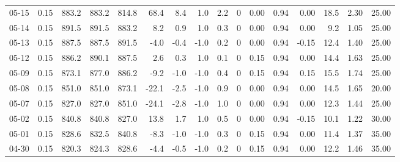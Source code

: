 \begin{threeparttable}
{\begin{tabular}{lrrrrrrrrrrrrrrr}
  05-15 &     0.15 & 883.2 & 883.2 & 814.8 &       68.4 &            8.4 &                      1.0 &                 2.2 &              0 &       0.00 &      0.94 &           0.00 &             18.5 &            2.30 &                  25.00 \\
  05-14 &     0.15 & 891.5 & 891.5 & 883.2 &        8.2 &            0.9 &                      1.0 &                 0.3 &              0 &       0.00 &      0.94 &           0.00 &              9.2 &            1.05 &                  25.00 \\
  05-13 &     0.15 & 887.5 & 887.5 & 891.5 &       -4.0 &           -0.4 &                     -1.0 &                 0.2 &              0 &       0.00 &      0.94 &          -0.15 &             12.4 &            1.40 &                  25.00 \\
  05-12 &     0.15 & 886.2 & 890.1 & 887.5 &        2.6 &            0.3 &                      1.0 &                 0.1 &              0 &       0.15 &      0.94 &           0.00 &             14.4 &            1.63 &                  25.00 \\
  05-09 &     0.15 & 873.1 & 877.0 & 886.2 &       -9.2 &           -1.0 &                     -1.0 &                 0.4 &              0 &       0.15 &      0.94 &           0.15 &             15.5 &            1.74 &                  25.00 \\
  05-08 &     0.15 & 851.0 & 851.0 & 873.1 &      -22.1 &           -2.5 &                     -1.0 &                 0.9 &              0 &       0.00 &      0.94 &           0.00 &             14.5 &            1.65 &                  20.00 \\
  05-07 &     0.15 & 827.0 & 827.0 & 851.0 &      -24.1 &           -2.8 &                     -1.0 &                 1.0 &              0 &       0.00 &      0.94 &           0.00 &             12.3 &            1.44 &                  25.00 \\
  05-02 &     0.15 & 840.8 & 840.8 & 827.0 &       13.8 &            1.7 &                      1.0 &                 0.5 &              0 &       0.00 &      0.94 &          -0.15 &             10.1 &            1.22 &                  30.00 \\
  05-01 &     0.15 & 828.6 & 832.5 & 840.8 &       -8.3 &           -1.0 &                     -1.0 &                 0.3 &              0 &       0.15 &      0.94 &           0.00 &             11.4 &            1.37 &                  35.00 \\
  04-30 &     0.15 & 820.3 & 824.3 & 828.6 &       -4.4 &           -0.5 &                     -1.0 &                 0.2 &              0 &       0.15 &      0.94 &           0.00 &             12.2 &            1.46 &                  35.00 \\

\end{tabular}}
\end{threeparttable}
